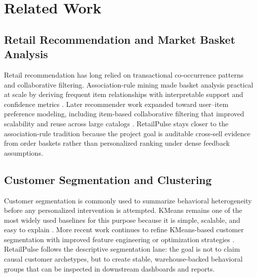 \documentclass[journal]{IEEEtran}
\begin{document}
\section{Related Work}
\subsection{Retail Recommendation and Market Basket Analysis}
Retail recommendation has long relied on transactional co-occurrence patterns and collaborative filtering. Association-rule mining made basket analysis practical at scale by deriving frequent item relationships with interpretable support and confidence metrics \cite{agrawal1994association}. Later recommender work expanded toward user--item preference modeling, including item-based collaborative filtering that improved scalability and reuse across large catalogs \cite{sarwar2001itembased}. RetailPulse stays closer to the association-rule tradition because the project goal is auditable cross-sell evidence from order baskets rather than personalized ranking under dense feedback assumptions.

\subsection{Customer Segmentation and Clustering}
Customer segmentation is commonly used to summarize behavioral heterogeneity before any personalized intervention is attempted. KMeans remains one of the most widely used baselines for this purpose because it is simple, scalable, and easy to explain \cite{macqueen1967kmeans}. More recent work continues to refine KMeans-based customer segmentation with improved feature engineering or optimization strategies \cite{li2021customersegmentation}. RetailPulse follows the descriptive segmentation lane: the goal is not to claim causal customer archetypes, but to create stable, warehouse-backed behavioral groups that can be inspected in downstream dashboards and reports.
\end{document}
